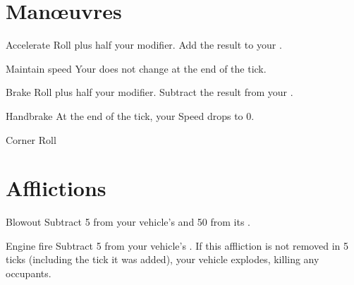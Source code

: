 \documentclass[10pt, a4paper, twocolumn]{article}
\begin{document}
\section{Man\oe{}uvres}

\begin{describe}{Accelerate}
  Roll  plus half your  modifier. Add the result to your .
\end{describe}

\begin{describe}{Maintain speed}
  Your  does not change at the end of the tick.
\end{describe}

\begin{describe}{Brake}
  Roll  plus half your  modifier. Subtract the result from your .
\end{describe}

\begin{describe}{Handbrake}
  At the end of the tick, your Speed drops to 0.
\end{describe}

\begin{describe}{Corner}
  Roll 
\end{describe}

\section{Afflictions}

\begin{describe}{Blowout}
  Subtract 5 from your vehicle's  and 50 from its .
\end{describe}

\begin{describe}{Engine fire}
  Subtract 5 from your vehicle's . If this affliction is not removed in 5 ticks (including the tick it was added), your vehicle explodes, killing any occupants.
\end{describe}
\end{document}
